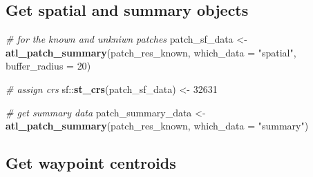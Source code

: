 \documentclass[
]{scrreprt}
\newenvironment{Shaded}{}{}
\newcommand{\CommentTok}[1]{\textcolor[rgb]{0.38,0.63,0.69}{\textit{#1}}}
\newcommand{\DataTypeTok}[1]{\textcolor[rgb]{0.56,0.13,0.00}{#1}}
\newcommand{\DecValTok}[1]{\textcolor[rgb]{0.25,0.63,0.44}{#1}}
\newcommand{\KeywordTok}[1]{\textcolor[rgb]{0.00,0.44,0.13}{\textbf{#1}}}
\newcommand{\NormalTok}[1]{#1}
\newcommand{\OperatorTok}[1]{\textcolor[rgb]{0.40,0.40,0.40}{#1}}
\newcommand{\StringTok}[1]{\textcolor[rgb]{0.25,0.44,0.63}{#1}}
\begin{document}
\hypertarget{get-spatial-and-summary-objects}{%
\subsection{Get spatial and summary objects}\label{get-spatial-and-summary-objects}}

\begin{Shaded}
\begin{Highlighting}[]
\CommentTok{\# for the known and unkniwn patches}
\NormalTok{patch\_sf\_data <{-}}\StringTok{ }\KeywordTok{atl\_patch\_summary}\NormalTok{(patch\_res\_known, }\DataTypeTok{which\_data =} \StringTok{"spatial"}\NormalTok{,}
                                   \DataTypeTok{buffer\_radius =} \DecValTok{20}\NormalTok{)}

\CommentTok{\# assign crs}
\NormalTok{sf}\OperatorTok{::}\KeywordTok{st\_crs}\NormalTok{(patch\_sf\_data) <{-}}\StringTok{ }\DecValTok{32631}

\CommentTok{\# get summary data}
\NormalTok{patch\_summary\_data <{-}}\StringTok{ }\KeywordTok{atl\_patch\_summary}\NormalTok{(patch\_res\_known, }\DataTypeTok{which\_data =} \StringTok{"summary"}\NormalTok{)}
\end{Highlighting}
\end{Shaded}

\hypertarget{get-waypoint-centroids}{%
\subsection{Get waypoint centroids}\label{get-waypoint-centroids}}
\end{document}
